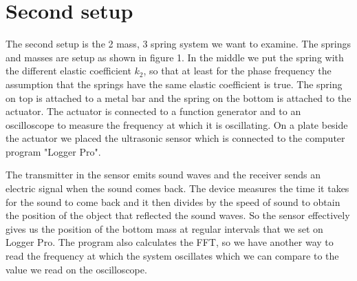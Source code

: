 \documentclass{article}
\begin{document}
\section{Second setup} \label{sec:setup2}
The second setup is the 2 mass, 3 spring system we want to examine. The springs and masses are setup as shown in figure 1. %
In the middle we put the spring with the different elastic coefficient $k_2$, so that at least for the phase frequency the assumption that the springs have the same elastic coefficient is true. 
The spring on top is attached to a metal bar and the spring on the bottom is attached to the actuator. The actuator is connected to a function generator and to an oscilloscope to measure the frequency at which it is oscillating. On a plate beside the actuator we placed the ultrasonic sensor which is connected to the computer program "Logger Pro". 

The transmitter in the sensor emits sound waves and the receiver sends an electric signal when the sound comes back. The device measures the time it takes for the sound to come back and it then divides by the speed of sound to obtain the position of the object that reflected the sound waves. So the sensor effectively gives us the position of the bottom mass at regular intervals that we set on Logger Pro. The program also calculates the FFT, so we have another way to read the frequency at which the system oscillates which we can compare to the value we read on the oscilloscope. 

\end{document}

